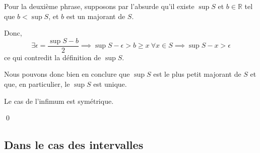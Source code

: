 \documentclass{article}
\begin{document}
{{        

        Pour la deuxième phrase, supposons par l'absurde qu'il existe $\sup S$ et $b \in \mathbb{R}$ tel que $b < \sup S$, et $b$ est un majorant de $S$.

        Donc,
        \[\exists \epsilon = \frac{\sup S - b}{2} \implies \sup S - \epsilon > b \geq x \ \forall x \in S \implies \sup S - x > \epsilon\]
        ce qui contredit la définition de $\sup S$.

        Nous pouvons donc bien en conclure que $\sup S$ est le plus petit majorant de $S$ et que, en particulier, le $\sup S$ est unique.

        Le cas de l'infimum est symétrique.

        \qed
    }
}

\subsection{Dans le cas des intervalles}
\end{document}
